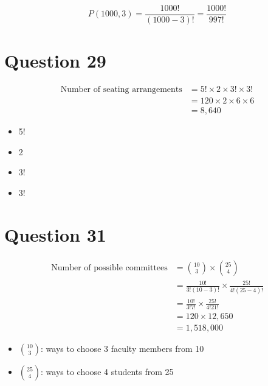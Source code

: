 \documentclass{article}
\begin{document}
    \begin{equation}
    P(1000, 3) = \frac{1000!}{(1000-3)!} = \frac{1000!}{997!}
    \end{equation}

\section{Question 29}
\begin{align*}
    \text{Number of seating arrangements} &= 5! \times 2 \times 3! \times 3! \\
    &= 120 \times 2 \times 6 \times 6 \\
    &= 8,640
    \end{align*}
    
    \begin{itemize}
        \item 5! 
        \item 2 
        \item 3! 
        \item 3! 
    \end{itemize}

\section{Question 31}
\begin{align*}
    \text{Number of possible committees} &= \binom{10}{3} \times \binom{25}{4} \\[6pt]
    &= \frac{10!}{3!(10-3)!} \times \frac{25!}{4!(25-4)!} \\[6pt]
    &= \frac{10!}{3!7!} \times \frac{25!}{4!21!} \\[6pt]
    &= 120 \times 12,650 \\[6pt]
    &= 1,518,000
    \end{align*}
    
    \begin{itemize}
        \item $\binom{10}{3}$: ways to choose 3 faculty members from 10
        \item $\binom{25}{4}$: ways to choose 4 students from 25
    \end{itemize}
\end{document}
